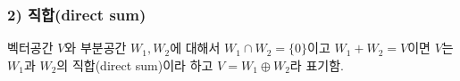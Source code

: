 \subsubsection*{2) 직합(direct sum)\\}
\begin{DEF}
벡터공간 $V$와 부분공간 $W_1,W_2$에 대해서 $W_1 \cap W_2 =\{0\}$이고 $W_1 + W_2=V$이면 $V$는 $W_1$과 $W_2$의 직합(direct sum)이라 하고 $V=W_1 \oplus W_2$라 표기함.
\end{DEF}


